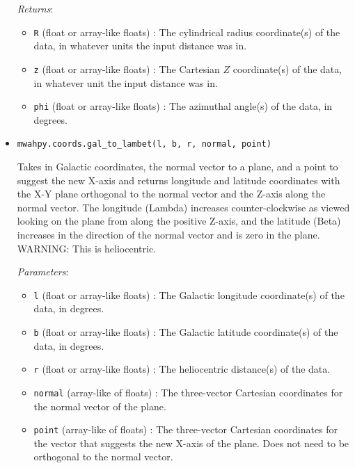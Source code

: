 \documentclass{article}
\begin{document}
\begin{itemize}
\begin{itemize}
\end{itemize}

\textit{Returns}: \begin{itemize}

\item \verb!R! (float or array-like floats) : The cylindrical radius coordinate(s) of the data, in whatever units the input distance was in.

\item \verb!z! (float or array-like floats) : The Cartesian $Z$ coordinate(s) of the data, in whatever unit the input distance was in.

\item \verb!phi! (float or array-like floats) : The azimuthal angle(s) of the data, in degrees.

\end{itemize}



\item \verb!mwahpy.coords.gal_to_lambet(l, b, r, normal, point)!

Takes in Galactic coordinates, the normal vector to a plane, and a point to suggest the new X-axis and returns longitude and latitude coordinates with the X-Y plane orthogonal to the normal vector and the Z-axis along the normal vector. The longitude (Lambda) increases counter-clockwise as viewed looking on the plane from along the positive Z-axis, and the latitude (Beta) increases in the direction of the normal vector and is zero in the plane. WARNING: This is heliocentric. 

\textit{Parameters}: \begin{itemize}

\item \verb!l! (float or array-like floats) : The Galactic longitude coordinate(s) of the data, in degrees.

\item \verb!b! (float or array-like floats) : The Galactic latitude coordinate(s) of the data, in degrees.

\item \verb!r! (float or array-like floats) : The heliocentric distance(s) of the data.

\item \verb!normal! (array-like of floats) : The three-vector Cartesian coordinates for the normal vector of the plane.

\item \verb!point! (array-like of floats) : The three-vector Cartesian coordinates for the vector that suggests the new X-axis of the plane. Does not need to be orthogonal to the normal vector.


\end{itemize}
\end{itemize}
\end{document}
